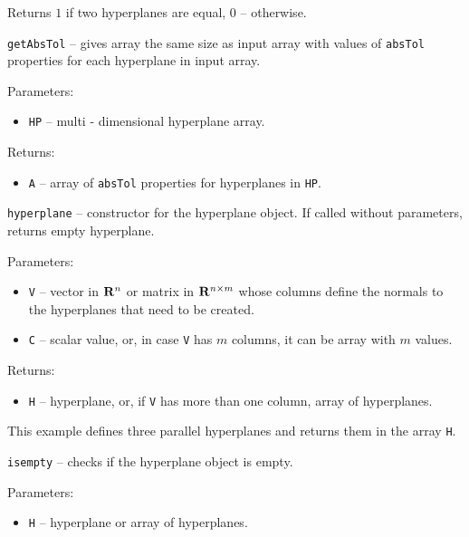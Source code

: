 Returns $1$ if two hyperplanes are equal, $0$ -- otherwise.



\newpage
{\Large {\tt getAbsTol}} -- gives array the same size as input array with values
of {\tt absTol} properties for each hyperplane in input array.

Parameters:
\begin{itemize}
\item {\tt HP} -- multi - dimensional hyperplane array.
\end{itemize}

Returns:
\begin{itemize}
\item {\tt A} -- array of {\tt absTol} properties for hyperplanes in {\tt HP}.
\end{itemize}

\newpage

{\Large {\tt hyperplane}} -- constructor for the hyperplane object.
If called without parameters, returns empty hyperplane.

Parameters:
\begin{itemize}
\item {\tt V} -- vector in ${\bf R}^n$ or matrix in ${\bf R}^{n\times m}$ whose
columns define the normals to the hyperplanes that need to be created.
\item {\tt C} -- scalar value, or, in case {\tt V} has $m$ columns, it can be
array with $m$ values.
\end{itemize}

Returns:
\begin{itemize}
\item {\tt H} -- hyperplane, or, if {\tt V} has more than one column,
array of hyperplanes.
\end{itemize}


This example defines three parallel hyperplanes and returns them in the array {\tt H}.

\newpage

{\Large {\tt isempty}} -- checks if the hyperplane object is empty.

Parameters:
\begin{itemize}
\item {\tt H} -- hyperplane or array of hyperplanes.
\end{itemize}


